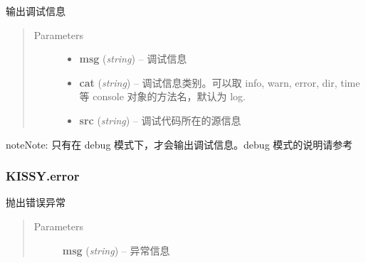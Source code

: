 \documentclass[letterpaper,10pt,english]{sphinxmanual}
\begin{document}
\begin{fulllineitems}
\label{api/seed/kissy/log:Seed.KISSY.log}
输出调试信息
\begin{quote}\begin{description}
\item[{Parameters}] \leavevmode\begin{itemize}
\item {}
\textbf{msg} (\emph{string}) -- 调试信息

\item {}
\textbf{cat} (\emph{string}) -- 调试信息类别。可以取 info, warn, error, dir, time 等 console 对象的方法名，默认为 log.

\item {}
\textbf{src} (\emph{string}) -- 调试代码所在的源信息

\end{itemize}

\end{description}\end{quote}

\end{fulllineitems}


\begin{notice}{note}{Note:}
只有在 debug 模式下，才会输出调试信息。debug 模式的说明请参考 {\hyperref[api/seed/kissy/Config:Seed.KISSY.Config]{}}
\end{notice}


\subsubsection{KISSY.error}
\label{api/seed/kissy/error:kissy-error}\label{api/seed/kissy/error::doc}

\begin{fulllineitems}
\label{api/seed/kissy/error:Seed.KISSY.error}
抛出错误异常
\begin{quote}\begin{description}
\item[{Parameters}] \leavevmode
\textbf{msg} (\emph{string}) -- 异常信息

\end{description}\end{quote}

\end{fulllineitems}
\end{document}
